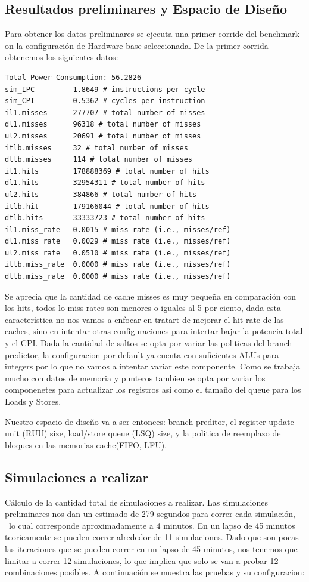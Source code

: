 \documentclass[journal]{IEEEtran}
\begin{document}
\subsection{Resultados preliminares y Espacio de Dise\~no}
Para obtener los datos preliminares se ejecuta una primer corride del benchmark on la configuraci\'on de Hardware base seleccionada.
De la primer corrida obtenemos los siguientes datos: \newline
\footnotesize \begin{verbatim}
Total Power Consumption: 56.2826
sim_IPC         1.8649 # instructions per cycle
sim_CPI         0.5362 # cycles per instruction
il1.misses      277707 # total number of misses
dl1.misses      96318 # total number of misses
ul2.misses      20691 # total number of misses
itlb.misses     32 # total number of misses
dtlb.misses     114 # total number of misses
il1.hits        178888369 # total number of hits
dl1.hits        32954311 # total number of hits
ul2.hits        384866 # total number of hits
itlb.hit        179166044 # total number of hits
dtlb.hits       33333723 # total number of hits
il1.miss_rate   0.0015 # miss rate (i.e., misses/ref)
dl1.miss_rate   0.0029 # miss rate (i.e., misses/ref)
ul2.miss_rate   0.0510 # miss rate (i.e., misses/ref)
itlb.miss_rate  0.0000 # miss rate (i.e., misses/ref)
dtlb.miss_rate  0.0000 # miss rate (i.e., misses/ref)
\end{verbatim}
\normalsize

Se aprecia que la cantidad de cache misses es muy peque\~na en comparaci\'on con los hits, todos lo miss rates son menores o iguales al 5 por ciento, dada esta caracter\'istica no nos vamos a enfocar en tratart de mejorar el hit rate de las caches, sino en intentar otras configuraciones para intertar bajar la potencia total y el CPI.
Dada la cantidad de saltos se opta por variar las politicas del branch predictor, la configuracion por default ya cuenta con suficientes ALUs para integers por lo que no vamos a intentar variar este componente.  Como se trabaja mucho con datos de memoria y punteros tambien se opta por variar los componenetes para actualizar los registros as\'i como el tama\~no del queue para los Loads y Stores.

Nuestro espacio de dise\~no va a ser entonces: branch preditor, el register update unit (RUU) size, load/store queue (LSQ) size, y la politica de reemplazo de bloques en las memorias cache(FIFO, LFU).

\subsection{Simulaciones a realizar}
C\'{a}lculo de la cantidad total de simulaciones a realizar.
Las simulaciones preliminares nos dan un estimado de 279 segundos para correr cada simulaci\'{o}n, \
lo cual corresponde aproximadamente a 4 minutos.  En un lapso de 45 minutos teoricamente se pueden correr alrededor de 11 simulaciones. Dado que son pocas las iteraciones que se pueden correr en un lapso de 45 minutos,
nos tenemos que limitar a correr 12 simulaciones, lo que implica que solo se van a probar 12 combinaciones posibles.
A continuaci\'{o}n se muestra las pruebas y su configuracion: \newline
\end{document}

